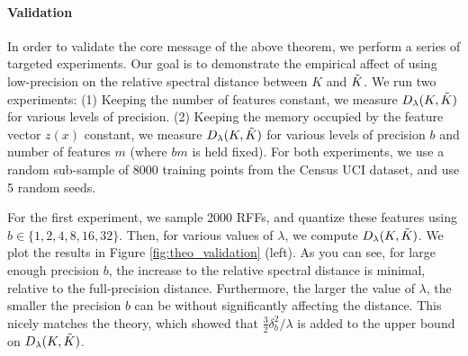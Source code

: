 



\paragraph{Validation} In order to validate the core message of the above theorem, we perform a series of targeted experiments. Our goal is to demonstrate the empirical affect of using low-precision on the relative spectral distance between $K$ and $\tilde{K}$. We run two experiments: (1) Keeping the number of features constant, we measure $D_{\lambda}(K,\tilde{K})$ for various levels of precision. (2) Keeping the memory occupied by the feature vector $z(x)$ constant, we measure $D_{\lambda}(K,\tilde{K})$ for various levels of precision $b$ and number of features $m$ (where $bm$ is held fixed). For both experiments, we use a random sub-sample of $8000$ training points from the Census UCI dataset, and use 5 random seeds.

For the first experiment, we sample 2000 RFFs, and quantize these features using $b \in \{1,2,4,8,16,32\}$.  Then, for various values of $\lambda$, we compute $D_{\lambda}(K,\tilde{K})$.  We plot the results in Figure \ref{fig:theo_validation} (left). As you can see, for large enough precision $b$, the increase to the relative spectral distance is minimal, relative to the full-precision distance. Furthermore, the larger the value of $\lambda$, the smaller the precision $b$ can be without significantly affecting the distance. This nicely matches the theory, which showed that $\frac{3}{2}\delta_b^2/\lambda$ is added to the upper bound on $D_{\lambda}(K,\tilde{K})$.

